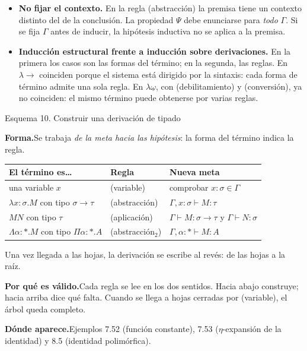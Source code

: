 \documentclass[11pt,a4paper]{article}
\newcommand{\forma}{\par\noindent\textbf{Forma.}\enspace}
\newcommand{\porque}{\par\smallskip\noindent\textbf{Por qué es válido.}\enspace}
\newcommand{\donde}{\par\smallskip\noindent\textbf{Dónde aparece.}\enspace}
\begin{document}
\begin{trampa}
\begin{itemize}
  \item \textbf{No fijar el contexto.} En la regla (abstracción) la premisa
    tiene un contexto distinto del de la conclusión. La propiedad \(\Psi\)
    debe enunciarse para \emph{todo} \(\Gamma\). Si se fija \(\Gamma\) antes
    de inducir, la hipótesis inductiva no se aplica a la premisa.
  \item \textbf{Inducción estructural frente a inducción sobre derivaciones.}
    En la primera los casos son las formas del término; en la segunda, las
    reglas. En \(\lambda\!\to\) coinciden porque el sistema está dirigido por
    la sintaxis: cada forma de término admite una sola regla. En
    \(\lambda\underline{\omega}\), con (debilitamiento) y (conversión), ya no
    coinciden: el mismo término puede obtenerse por varias reglas.
\end{itemize}
\end{trampa}

\begin{esquema}{Esquema 10. Construir una derivación de tipado}
\forma Se trabaja \emph{de la meta hacia las hipótesis}: la forma del término
indica la regla.
\begin{center}
\begin{tabular}{@{}lll@{}}
\toprule
\textbf{El término es\dots} & \textbf{Regla} & \textbf{Nueva meta}\\
\midrule
una variable \(x\) & (variable) & comprobar \(x:\sigma\in\Gamma\)\\
\(\lambda x{:}\sigma.M\) con tipo \(\sigma\to\tau\) & (abstracción) & \(\Gamma,x:\sigma\vdash M:\tau\)\\
\(MN\) con tipo \(\tau\) & (aplicación) & \(\Gamma\vdash M:\sigma\to\tau\) y \(\Gamma\vdash N:\sigma\)\\
\(\Lambda\alpha{:}*.M\) con tipo \(\Pi\alpha{:}*.A\) & (abstracción\(_2\)) & \(\Gamma,\alpha:*\vdash M:A\)\\
\bottomrule
\end{tabular}
\end{center}
Una vez llegada a las hojas, la derivación se escribe al revés: de las hojas a
la raíz.

\porque Cada regla se lee en los dos sentidos. Hacia abajo construye; hacia
arriba dice qué falta. Cuando se llega a hojas cerradas por (variable), el
árbol queda completo.

\donde Ejemplos 7.52 (función constante), 7.53 (\(\eta\)-expansión de la
identidad) y 8.5 (identidad polimórfica).
\end{esquema}
\end{document}
